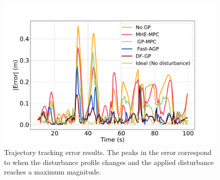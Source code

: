 






\begin{figure}[t]
	\centering	\includegraphics[width=0.90\linewidth]{figures/Simulations/traj_err_mhe.pdf}
	\caption{Trajectory tracking error results. The peaks in the error correspond to when the disturbance profile changes and the applied disturbance reaches a maximum magnitude.} %
	\label{fig:traj_error}
\end{figure}








